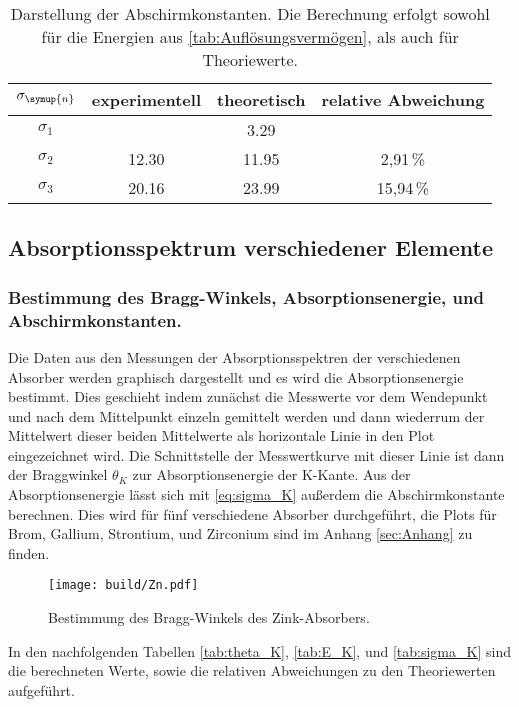 \begin{table}
  \centering
  \caption{Darstellung der Abschirmkonstanten. Die Berechnung erfolgt sowohl für die Energien aus \autoref{tab:Auflösungsvermögen}, %
  als auch für Theoriewerte.}
  \label{tab:Abschirmkonstanten}
  \begin{tabular}{c S[table-format=2.2] S[table-format=2.2] S[table-format=2.2]}
    \toprule
    {$\sigma_{\symup{n}}$} & {experimentell} & {theoretisch} & {relative Abweichung}\\
    \midrule
    $\sigma_1$  & {}    & 3.29  & {}        \\
    $\sigma_2$  & 12.30 & 11.95 & 2,91\,\%  \\
    $\sigma_3$  & 20.16 & 23.99 & 15,94\,\% \\
    \bottomrule
  \end{tabular}
\end{table}

\subsection{Absorptionsspektrum verschiedener Elemente}
\subsubsection{Bestimmung des Bragg-Winkels, Absorptionsenergie, und Abschirmkonstanten.}
Die Daten aus den Messungen der Absorptionsspektren der verschiedenen Absorber werden graphisch dargestellt und es wird die
Absorptionsenergie bestimmt. Dies geschieht indem zunächst die Messwerte vor dem Wendepunkt und nach dem Mittelpunkt einzeln gemittelt
werden und dann wiederrum der Mittelwert dieser beiden Mittelwerte als horizontale Linie in den Plot eingezeichnet wird. Die Schnittstelle
der Messwertkurve mit dieser Linie ist dann der Braggwinkel $\theta_{K}$ zur Absorptionsenergie der K-Kante.
Aus der Absorptionsenergie lässt sich mit \eqref{eq:sigma_K} außerdem die Abschirmkonstante berechnen. Dies wird für fünf verschiedene
Absorber durchgeführt, die Plots für Brom, Gallium, Strontium, und Zirconium sind im Anhang \ref{sec:Anhang} zu finden.

\begin{figure}[H]
  \centering
  \texttt{[image: build/Zn.pdf]}
  \caption{Bestimmung des Bragg-Winkels des Zink-Absorbers.}
  \label{fig:Zn}
\end{figure}

In den nachfolgenden Tabellen \ref{tab:theta_K}, \ref{tab:E_K}, und \ref{tab:sigma_K} sind die berechneten Werte, sowie die relativen 
Abweichungen zu den Theoriewerten aufgeführt.

